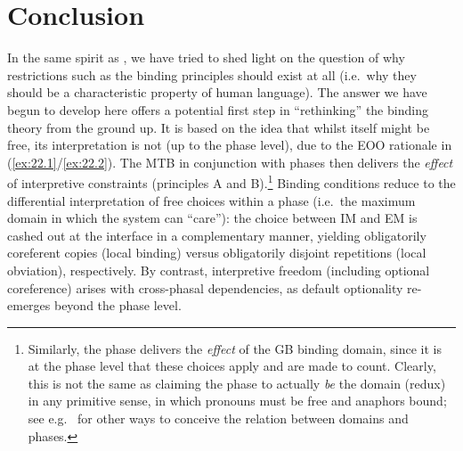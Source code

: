 \documentclass[output=paper]{langsci/langscibook}
\begin{document}
\section{Conclusion}

In the same spirit as \textcite{Hornstein2009,Hornstein2013}, we have tried to
shed light on the question of why restrictions such as the binding
principles should exist at all (i.e.\ why they should be a
characteristic property of human language). The answer we have begun to develop
here offers a potential first step in \enquote{rethinking} the binding theory
from the ground up. It is based on the idea that whilst  itself
might be free, its interpretation is not (up to the phase level),
due to the \gls{EOO} rationale in (\ref{ex:22.1}/\ref{ex:22.2}).  The \gls{MTB} in
conjunction with phases then delivers the \emph{effect} of interpretive
constraints (principles A and B).\footnote{Similarly, the phase
    delivers the \emph{effect} of the \gls{GB} binding domain, since it is at
    the phase level that these choices apply and are made to count.
    Clearly, this is not the same as claiming the phase to actually
    \emph{be} the  domain (redux) in any primitive sense, in which
    pronouns must be free and anaphors bound; see e.g.\
    \citealt{UriGal2006,Hicks2009,Sabel2012} for other ways to conceive the
relation between \isi{binding} domains and phases.} Binding conditions reduce
to the differential interpretation of free \isi{Merge} choices within a
phase\is{phases} (i.e.\ the maximum domain in which the system can
\enquote{care}): the choice between \gls{IM} and \gls{EM}\is{Merge}
is cashed out at the interface in a complementary manner, yielding obligatorily
coreferent copies (local binding) versus obligatorily disjoint repetitions
(local obviation), respectively. By contrast, interpretive freedom (including
optional coreference) arises with cross-phasal\is{phases} dependencies, as default
optionality re-emerges beyond the phase level.
\end{document}
